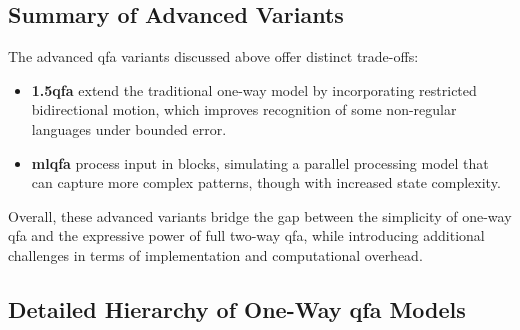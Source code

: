 \subsection*{Summary of Advanced Variants}
The advanced qfa variants discussed above offer distinct trade-offs:
\begin{itemize}
    \item \textbf{\gls{1.5qfa}} extend the traditional one-way model by incorporating restricted bidirectional motion, which improves recognition of some non-regular languages under bounded error.
    \item \textbf{\gls{mlqfa}} process input in blocks, simulating a parallel processing model that can capture more complex patterns, though with increased state complexity.
\end{itemize}
Overall, these advanced variants bridge the gap between the simplicity of one-way qfa and the expressive power of full two-way qfa, while introducing additional challenges in terms of implementation and computational overhead.


\subsection*{Detailed Hierarchy of One-Way qfa Models}
\label{subsec:hierarchy-diagram}

